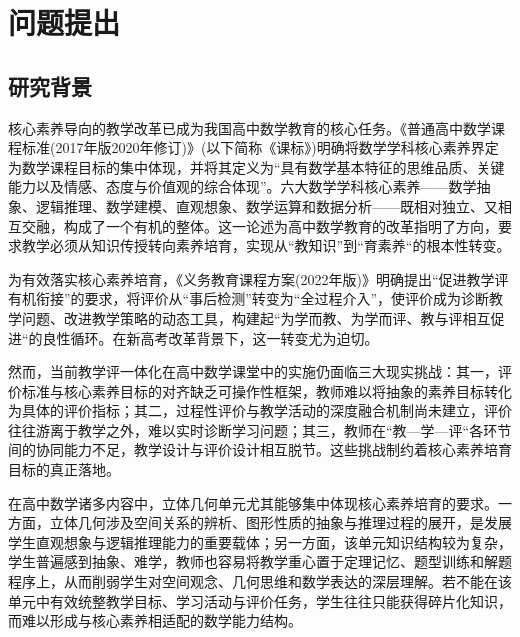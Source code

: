 \documentclass[UTF8,a4paper,12pt,twoside]{ctexart}
\begin{document}

\newpage%
\pagestyle{empty}
\tableofcontents%
\newpage%

\newpage
\section{问题提出}
\subsection{研究背景}
核心素养导向的教学改革已成为我国高中数学教育的核心任务。《普通高中数学课程标准(2017年版2020年修订)》(以下简称《课标》)明确将数学学科核心素养界定为数学课程目标的集中体现，并将其定义为“具有数学基本特征的思维品质、关键能力以及情感、态度与价值观的综合体现”。六大数学学科核心素养——数学抽象、逻辑推理、数学建模、直观想象、数学运算和数据分析——既相对独立、又相互交融，构成了一个有机的整体。这一论述为高中数学教育的改革指明了方向，要求教学必须从知识传授转向素养培育，实现从“教知识”到“育素养“的根本性转变。

为有效落实核心素养培育，《义务教育课程方案(2022年版)》明确提出“促进教学评有机衔接”的要求，将评价从“事后检测”转变为“全过程介入”，使评价成为诊断教学问题、改进教学策略的动态工具，构建起“为学而教、为学而评、教与评相互促进“的良性循环。在新高考改革背景下，这一转变尤为迫切。

然而，当前教学评一体化在高中数学课堂中的实施仍面临三大现实挑战：其一，评价标准与核心素养目标的对齐缺乏可操作性框架，教师难以将抽象的素养目标转化为具体的评价指标；其二，过程性评价与教学活动的深度融合机制尚未建立，评价往往游离于教学之外，难以实时诊断学习问题；其三，教师在“教—学—评“各环节间的协同能力不足，教学设计与评价设计相互脱节。这些挑战制约着核心素养培育目标的真正落地。

在高中数学诸多内容中，立体几何单元尤其能够集中体现核心素养培育的要求。一方面，立体几何涉及空间关系的辨析、图形性质的抽象与推理过程的展开，是发展学生直观想象与逻辑推理能力的重要载体；另一方面，该单元知识结构较为复杂，学生普遍感到抽象、难学，教师也容易将教学重心置于定理记忆、题型训练和解题程序上，从而削弱学生对空间观念、几何思维和数学表达的深层理解。若不能在该单元中有效统整教学目标、学习活动与评价任务，学生往往只能获得碎片化知识，而难以形成与核心素养相适配的数学能力结构。
\end{document}
